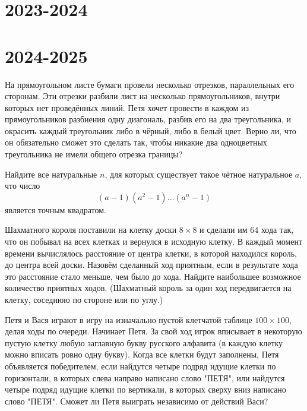 \documentclass[11pt, a4paper]{common/document_template}
\begin{document}
\chapter{2023-2024}

\begin{exercise}

\end{exercise}



\chapter{2024-2025}

\begin{exercise}
На прямоугольном листе бумаги провели несколько отрезков, параллельных его сторонам. Эти отрезки разбили лист на несколько прямоугольников, внутри которых нет проведённых линий. Петя хочет провести в каждом из прямоугольников разбиения одну диагональ, разбив его на два треугольника, и окрасить каждый треугольник либо в чёрный, либо в белый цвет. Верно ли, что он обязательно сможет это сделать так, чтобы никакие два одноцветных треугольника не имели общего отрезка границы?
\end{exercise}

\begin{Solution}
\end{Solution}

\begin{exercise}
Найдите все натуральные $n$, для которых существует такое чётное натуральное $a$, что число 
$$
(a - 1)(a^{2} - 1)\dots(a^{n} - 1)
$$ 
является точным квадратом.
\end{exercise}

\begin{exercise}
Шахматного короля поставили на клетку доски $8 \times 8$ и сделали им 64 хода так, что он побывал на всех клетках и вернулся в исходную клетку. В каждый момент времени вычислялось расстояние от центра клетки, в которой находился король, до центра всей доски. Назовём сделанный ход приятным, если в результате хода это расстояние стало меньше, чем было до хода. Найдите наибольшее возможное
количество приятных ходов. (Шахматный король за один ход передвигается на клетку, соседнюю по стороне или по углу.)
\end{exercise}

\begin{exercise}
Петя и Вася играют в игру на изначально пустой клетчатой таблице $100 \times 100$, делая ходы по очереди. Начинает Петя. За свой ход игрок вписывает в некоторую пустую клетку любую заглавную букву русского алфавита (в каждую клетку можно вписать ровно одну букву). Когда все клетки будут заполнены, Петя объявляется победителем, если найдутся четыре подряд идущие клетки по горизонтали, в
которых слева направо написано слово "ПЕТЯ", или найдутся четыре подряд идущие клетки по вертикали, в которых сверху вниз написано слово "ПЕТЯ". Сможет ли Петя
выиграть независимо от действий Васи?
\end{exercise}
\end{document}
